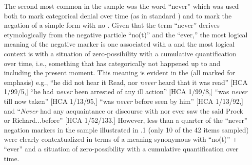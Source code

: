 The second most common  in the sample was the word “never” which was used both to mark categorical denial over time (as in standard ) and to mark the negation of a simple  form with no . Given that the term “never” derives etymologically from the negative particle “no(t)” and the  “ever,” the most logical meaning of the negative marker is one associated with a  and the most logical context is with a situation of zero-possibility with a cumulative quantification over time, i.e., something that has categorically not happened up to and including the present moment. This meaning is evident in the  (all marked for emphasis) e.g., “he did not hear it Read, nor \textit{never} heard that it was read” [HCA 1/99/5,] “he had \textit{never} been arrested of any ill action” [HCA 1/99/8,] “was \textit{never} till now taken” [HCA 1/13/95,] “was \textit{never} before seen by him” [HCA 1/13/92,] and “\textit{Never} had any acquaintance or discourse with nor ever saw the said Prock or Richard...before” [HCA 1/52/133.] However, less than a quarter of the “never” negation markers in the sample illustrated in .1 (only 10 of the 42 items sampled) were clearly contextualized in terms of a meaning synonymous with “no(t)” + “ever” and a situation of zero-possibility with a cumulative quantification over time. 

